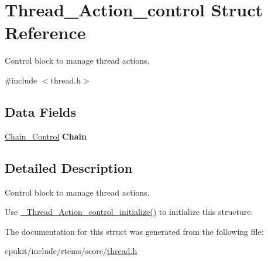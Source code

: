 \hypertarget{structThread__Action__control}{}\section{Thread\+\_\+\+Action\+\_\+control Struct Reference}
\label{structThread__Action__control}


Control block to manage thread actions.  




{\ttfamily \#include $<$thread.\+h$>$}

\subsection*{Data Fields}
\begin{DoxyCompactItemize}
\item 
\mbox{\label{structThread__Action__control_ab89602dcacb07ff24fe42b676449d29a}} 
\mbox{\hyperlink{unionChain__Control}{Chain\+\_\+\+Control}} {\bfseries Chain}
\end{DoxyCompactItemize}


\subsection{Detailed Description}
Control block to manage thread actions. 

Use \mbox{\hyperlink{group__RTEMSScoreThread_ga6c6a5ea33a2380faf75952592f7ff8f0}{\+\_\+\+Thread\+\_\+\+Action\+\_\+control\+\_\+initialize()}} to initialize this structure. 

The documentation for this struct was generated from the following file\+:\begin{DoxyCompactItemize}
\item 
cpukit/include/rtems/score/\mbox{\hyperlink{score_2thread_8h}{thread.\+h}}\end{DoxyCompactItemize}
